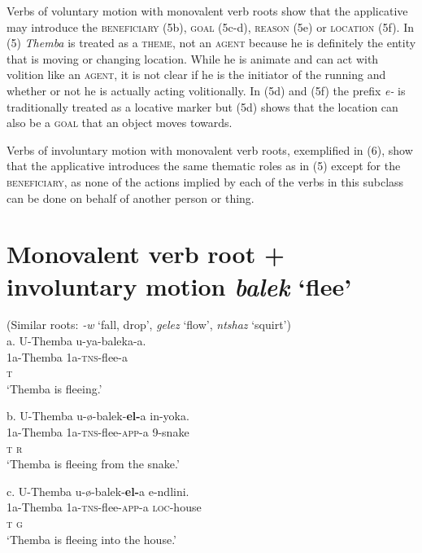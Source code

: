 \documentclass[output=paper]{langsci/langscibook}
\begin{document}
Verbs of voluntary motion with monovalent verb roots show that the applicative may introduce the \textsc{beneficiary }(5b), \textsc{goal }(5c-d), \textsc{reason }(5e) or \textsc{location }(5f). In (5) \textit{Themba} is treated as a \textsc{theme}, not an \textsc{agent} because he is definitely the entity that is moving or changing location. While he is animate and can act with volition like an \textsc{agent,} it is not clear if he is the initiator of the running and whether or not he is actually acting volitionally. In (5d) and (5f) the prefix \textit{e-} is traditionally treated as a locative marker but (5d) shows that the location can also be a \textsc{goal} that an object moves towards.

  Verbs of involuntary motion with monovalent verb roots, exemplified in (6), show that the applicative introduces the same thematic roles as in (5) except for the \textsc{beneficiary,} as none of the actions implied by each of the verbs in this subclass can be done on behalf of another person or thing.

\chapter[Monovalent verb root + involuntary motion balek ‘flee’]{Monovalent verb root + involuntary motion \textit{balek }‘flee’}
     (Similar roots: \textit{{}-w} ‘fall, drop’, \textit{gelez} ‘flow’, \textit{ntshaz} ‘squirt’)\\
\gll   a.  U-Themba   u-ya-baleka-a. \\
         1a-Themba     1a-\textsc{tns}{}-flee-a \\
         \textsc{t}\\
\glt     ‘Themba is fleeing.’
\z

\gll   b.  U-Themba   u-ø-balek-\textbf{el-}a     in-yoka. \\
         1a-Themba     1a-\textsc{tns}{}-flee-\textsc{app}{}-a  9-snake\\
         \textsc{t                  r}\\
\glt     ‘Themba is fleeing from the snake.’   
\z

\gll   c.  U-Themba   u-ø-balek-\textbf{el-}a        e-ndlini. \\
         1a-Themba     1a-\textsc{tns}{}-flee-\textsc{app}{}-a  \textsc{loc}{}-house\\
         \textsc{t                  g}\\
\glt     ‘Themba is fleeing into the house.’
\z
\end{document}
